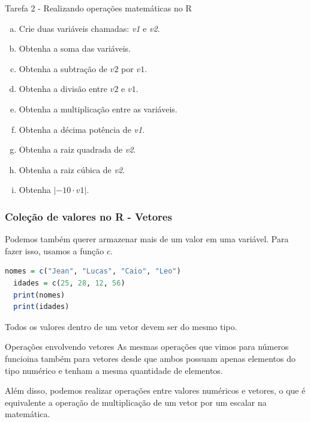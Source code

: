 \documentclass{beamer}
\begin{document}
\begin{frame}{Tarefa 2 - Realizando operações matemáticas no R}
  \begin{exercicio}
    \begin{enumerate}[a)]
      \item Crie duas variáveis chamadas: \textit{v1} e  \textit{v2}.
      \item Obtenha a soma das variáveis.
      \item Obtenha a subtração de $v2$ por $v1$.
      \item Obtenha a divisão entre $v2$ e $v1$.
      \item Obtenha a multiplicação entre as variáveis.
      \item Obtenha a décima potência de \textit{v1}.
      \item Obtenha a raiz quadrada de \textit{v2}.
      \item Obtenha a raiz cúbica de \textit{v2}.
      \item Obtenha  $|-10 \cdot v1|$.
    \end{enumerate}
  \end{exercicio}
\end{frame}

\begin{frame}[fragile]
  \frametitle{Coleção de valores no R - Vetores}

  Podemos também querer armazenar mais de um valor em uma variável. Para fazer isso, 
  usamos a função $c$. 

  \begin{lstlisting}[language=R]
  nomes = c("Jean", "Lucas", "Caio", "Leo")
  idades = c(25, 28, 12, 56)
  print(nomes)
  print(idades)
  \end{lstlisting}
  
  \begin{atencao}
    Todos os valores dentro de um vetor devem ser do mesmo tipo. 
  \end{atencao}
  
\end{frame}

\begin{frame}{Operações envolvendo vetores}
  As mesmas operações que vimos para números funcioina também para vetores desde que ambos 
  possuam apenas elementos do tipo numérico e tenham a mesma quantidade de elementos.
  
  \pause
  \vspace{5px}

  Além disso, podemos realizar operações entre valores numéricos e vetores, o que é equivalente 
  a operação de multiplicação de um vetor por um escalar na matemática. 
  
\end{frame}
\end{document}
